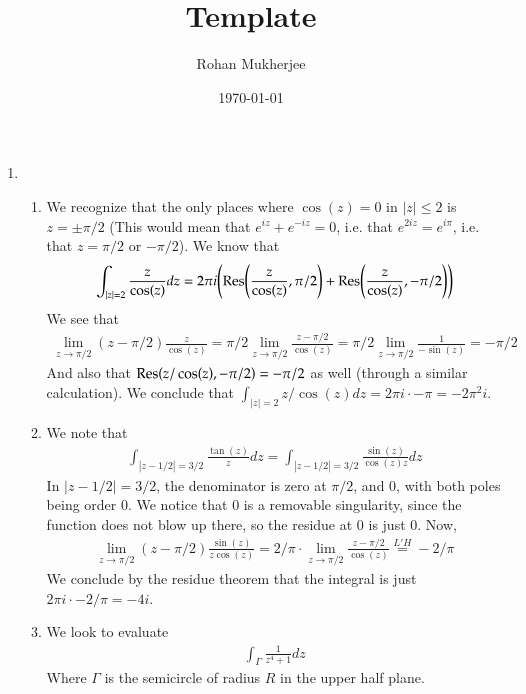 \documentclass[12pt]{article}
\title{Template}
\date{\today}
\author{Rohan Mukherjee}
\def\mbb#1{\mathbb{#1}}
\def \R{\mbb{R}}
\theoremstyle{definition}
\theoremstyle{remark}
\begin{document}
	\maketitle
	\begin{enumerate}[leftmargin=\labelsep]
		\item \begin{enumerate}
			\item We recognize that the only places where $\cos(z) = 0$ in $|z| \leq 2$ is $z = \pm \pi/2$ (This would mean that $e^{iz} + e^{-iz} = 0$, i.e. that $e^{2iz} = e^{i\pi}$, i.e. that $z = \pi/2$ or $-\pi/2$). We know that 
			\begin{align*}
				\int_{|z| = 2} \frac{z}{\cos(z)}dz = 2\pi i \qty(\mathrm{Res}\qty(\frac{z}{\cos(z)}, \pi/2) + \Res(\frac{z}{\cos(z)}, -\pi/2))
			\end{align*}
			We see that 
			\begin{align*}
				\lim_{z \to \pi/2} (z-\pi/2) \frac{z}{\cos(z)} = \pi/2 \lim_{z \to \pi/2} \frac{z-\pi/2}{\cos(z)} = \pi/2 \lim_{z \to \pi/2} \frac1{-\sin(z)} = -\pi/2
			\end{align*}
			And also that $\Res(z/\cos(z), -\pi/2) = -\pi/2$ as well (through a similar calculation). We conclude that $\int_{|z| = 2} z/\cos(z)dz = 2\pi i \cdot - \pi = -2\pi^2 i$.
			
			\item We note that
			\begin{align*}
				\int_{|z-1/2| = 3/2} \frac{\tan(z)}{z}dz = \int_{|z-1/2| = 3/2} \frac{\sin(z)}{\cos(z)z}dz
			\end{align*}
			In $|z-1/2| = 3/2$, the denominator is zero at $\pi/2$, and 0, with both poles being order 0. We notice that 0 is a removable singularity, since the function does not blow up there, so the residue at 0 is just 0. Now,
			\begin{align*}
				\lim_{z \to \pi/2} (z-\pi/2) \frac{\sin(z)}{z\cos(z)} = 2/\pi \cdot \lim_{z \to \pi/2} \frac{z-\pi/2}{\cos(z)} \overset{L'H}{=} -2/\pi
			\end{align*}
			We conclude by the residue theorem that the integral is just $2\pi i \cdot -2/\pi = -4i$.
			
			\item We look to evaluate
			\begin{align*}
				\int_{\Gamma} \frac{1}{z^4+1}dz
			\end{align*}
			Where $\Gamma$ is the semicircle of radius $R$ in the upper half plane. 
			
		

\end{enumerate}
\end{enumerate}
\end{document}
